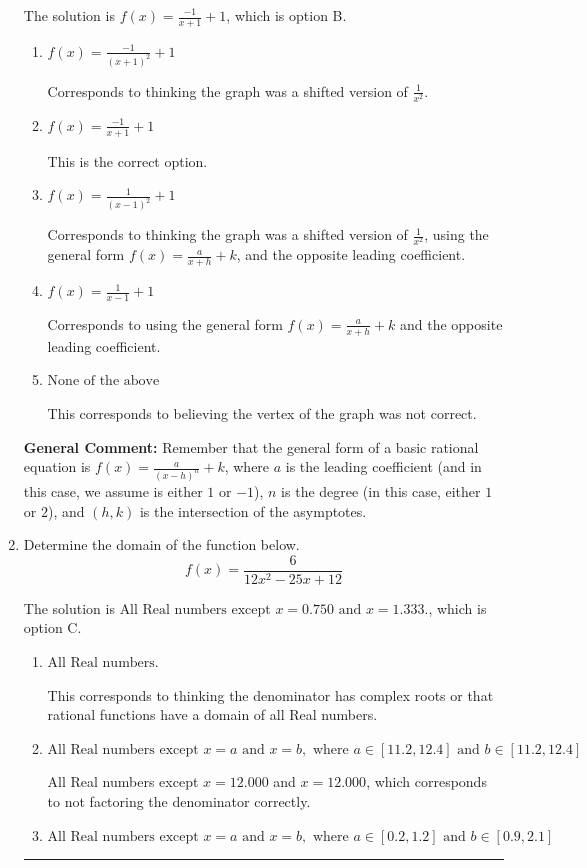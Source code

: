 \documentclass{extbook}[14pt]
\newcommand{\litem}[1]{\item #1

\rule{\textwidth}{0.4pt}}
\begin{document}
\begin{enumerate}
{The solution is \( f(x) = \frac{-1}{x + 1} + 1 \), which is option B.\begin{enumerate}[label=\Alph*.]
\item \( f(x) = \frac{-1}{(x + 1)^2} + 1 \)

Corresponds to thinking the graph was a shifted version of $\frac{1}{x^2}$.
\item \( f(x) = \frac{-1}{x + 1} + 1 \)

This is the correct option.
\item \( f(x) = \frac{1}{(x - 1)^2} + 1 \)

Corresponds to thinking the graph was a shifted version of $\frac{1}{x^2}$, using the general form $f(x) = \frac{a}{x+h}+k$, and the opposite leading coefficient.
\item \( f(x) = \frac{1}{x - 1} + 1 \)

Corresponds to using the general form $f(x) = \frac{a}{x+h}+k$ and the opposite leading coefficient.
\item \( \text{None of the above} \)

This corresponds to believing the vertex of the graph was not correct.
\end{enumerate}

\textbf{General Comment:} Remember that the general form of a basic rational equation is $ f(x) = \frac{a}{(x-h)^n} + k$, where $a$ is the leading coefficient (and in this case, we assume is either $1$ or $-1$), $n$ is the degree (in this case, either $1$ or $2$), and $(h, k)$ is the intersection of the asymptotes.
}
\litem{
Determine the domain of the function below.
\[ f(x) = \frac{6}{12x^{2} -25 x + 12} \]

The solution is \( \text{All Real numbers except } x = 0.750 \text{ and } x = 1.333. \), which is option C.\begin{enumerate}[label=\Alph*.]
\item \( \text{All Real numbers.} \)

This corresponds to thinking the denominator has complex roots or that rational functions have a domain of all Real numbers.
\item \( \text{All Real numbers except } x = a \text{ and } x = b, \text{ where } a \in [11.2, 12.4] \text{ and } b \in [11.2, 12.4] \)

All Real numbers except $x = 12.000$ and $x = 12.000$, which corresponds to not factoring the denominator correctly.
\item \( \text{All Real numbers except } x = a \text{ and } x = b, \text{ where } a \in [0.2, 1.2] \text{ and } b \in [0.9, 2.1] \)


\end{enumerate}}
\end{enumerate}
\end{document}
